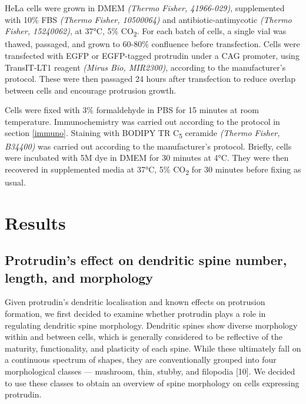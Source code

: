 \documentclass[
  12pt,
  a4paper,
]{book}
\begin{document}
HeLa cells were grown in DMEM \emph{(Thermo Fisher, 41966-029)}, supplemented with 10\% FBS \emph{(Thermo Fisher, 10500064)} and antibiotic-antimycotic \emph{(Thermo Fisher, 15240062)}, at 37°C, 5\% CO\textsubscript{2}. For each batch of cells, a single vial was thawed, passaged, and grown to 60-80\% confluence before transfection. Cells were transfected with EGFP or EGFP-tagged protrudin under a CAG promoter, using TransIT-LT1 reagent \emph{(Mirus Bio, MIR2300)}, according to the manufacturer's protocol. These were then passaged 24 hours after transfection to reduce overlap between cells and encourage protrusion growth.

Cells were fixed with 3\% formaldehyde in PBS for 15 minutes at room temperature. Immunochemistry was carried out according to the protocol in section \ref{immuno}. Staining with BODIPY TR C\textsubscript{5} ceramide \emph{(Thermo Fisher, B34400)} was carried out according to the manufacturer's protocol. Briefly, cells were incubated with 5\textmu{}M dye in DMEM for 30 minutes at 4°C. They were then recovered in supplemented media at 37°C, 5\% CO\textsubscript{2} for 30 minutes before fixing as usual.

\hypertarget{results-1}{%
\section{Results}\label{results-1}}

\hypertarget{protrudins-effect-on-dendritic-spine-number-length-and-morphology}{%
\subsection{Protrudin's effect on dendritic spine number, length, and morphology}\label{protrudins-effect-on-dendritic-spine-number-length-and-morphology}}

Given protrudin's dendritic localisation and known effects on protrusion formation, we first decided to examine whether protrudin plays a role in regulating dendritic spine morphology. Dendritic spines show diverse morphology within and between cells, which is generally considered to be reflective of the maturity, functionality, and plasticity of each spine. While these ultimately fall on a continuous spectrum of shapes, they are conventionally grouped into four morphological classes --- mushroom, thin, stubby, and filopodia {[}10{]}. We decided to use these classes to obtain an overview of spine morphology on cells expressing protrudin.
\end{document}
